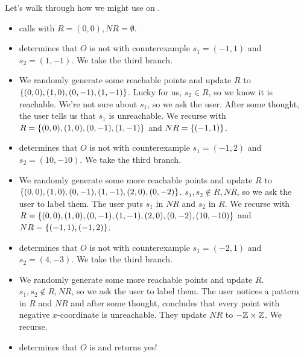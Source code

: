 Let's walk through how we might use \IsIconfluent{} on
.
\begin{itemize}
  \item
    \IsIconfluent{} calls \Helper{} with $R = {(0, 0)}, NR = \emptyset{}$.

  \item
    \Helper{} determines that $O$ is not  with
    counterexample $s_1 = (-1, 1)$ and $s_2 = (1, -1)$. We take the third
    branch.

  \item
    We randomly generate some reachable points and update $R$ to $\{(0, 0),
    (1, 0), (0, -1), (1, -1)\}$. Lucky for us, $s_2 \in R$, so we know it is
    reachable. We're not sure about $s_1$, so we ask the user. After some
    thought, the user tells us that $s_1$ is unreachable. We recurse with $R =
    \{(0, 0), (1, 0), (0, -1), (1, -1)\}$ and $NR = \{(-1, 1)\}$.

  \item
    \Helper{} determines that $O$ is not  with
    counterexample $s_1 = (-1, 2)$ and $s_2 = (10, -10)$. We take the third
    branch.

  \item
    We randomly generate some more reachable points and update $R$ to $\{(0,
    0), (1, 0), (0, -1), (1, -1), (2, 0), (0, -2)\}$. $s_1, s_2 \notin R, NR$,
    so we ask the user to label them. The user puts $s_1$ in $NR$ and $s_2$ in
    $R$. We recurse with $R = \{(0, 0), (1, 0), (0, -1), (1, -1), (2, 0),
    (0, -2), (10, -10)\}$ and $NR = \{(-1, 1), (-1, 2)\}$.

  \item
    \Helper{} determines that $O$ is not  with
    counterexample $s_1 = (-2, 1)$ and $s_2 = (4, -3)$. We take the third
    branch.

  \item
    We randomly generate some more reachable points and update $R$. $s_1, s_2
    \notin R, NR$, so we ask the user to label them. The user notices a pattern
    in $R$ and $NR$ and after some thought, concludes that every point with
    negative $x$-coordinate is unreachable. They update $NR$ to $-\mathbb{Z} \times
    \mathbb{Z}$. We recurse.

  \item
    \Helper{} determines that $O$ is  and returns yes!
\end{itemize}
